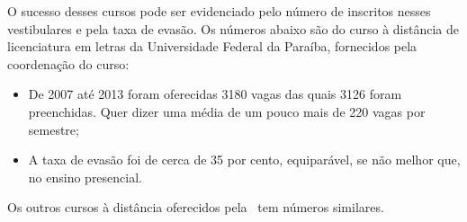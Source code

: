 O sucesso desses cursos pode ser evidenciado pelo n{\' u}mero de inscritos nesses vestibulares e pela taxa de 
evas{\~ a}o. Os n{\' u}meros abaixo s{\~ a}o do curso {\`a} dist{\^ a}ncia de licenciatura em letras da Universidade Federal da Para{\' i}ba, fornecidos pela 
coordena{\c c}{\~ a}o do curso:
\begin{itemize}
 \item De 2007 at{\'e} 2013 foram oferecidas 3180 vagas das quais 3126 foram preenchidas. 
 Quer dizer uma m{\'e}dia de um pouco mais de 220 vagas por semestre;
 
 \item A taxa de evas{\~ a}o  foi de cerca de 
35 por cento, equipar{\' a}vel, se n{\~ a}o melhor que, no ensino presencial.
\end{itemize}
 Os outros cursos {\`a} dist{\^ a}ncia oferecidos pela \ufpb\  tem n{\' u}meros similares.

 

